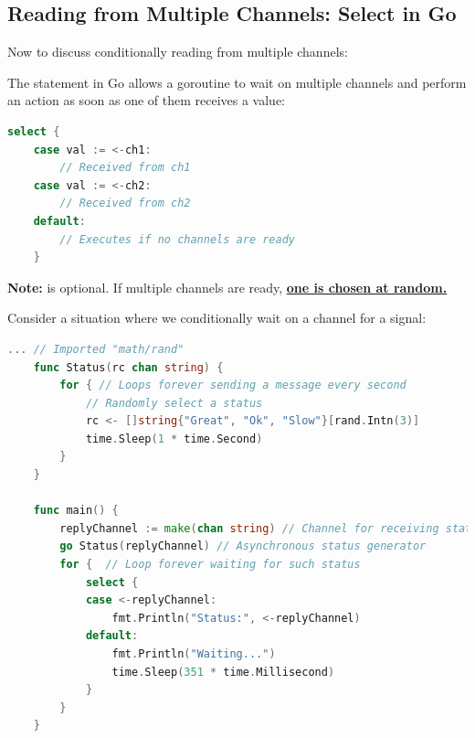 \newpage 

\subsection{Reading from Multiple Channels: Select in Go}

Now to discuss conditionally reading from multiple channels:

\begin{Def}

    The  statement in Go allows a goroutine to wait on multiple channels and perform an action as soon as one of them receives a value:
    \begin{lstlisting}[language=Go]
    select {
    case val := <-ch1:
        // Received from ch1
    case val := <-ch2:
        // Received from ch2
    default:
        // Executes if no channels are ready
    }
    \end{lstlisting}

    \noindent
    \textbf{Note:}  is optional. If multiple channels are ready, \underline{\textbf{one is chosen at random.}}
    \end{Def}
    
    \vspace{-.5em}
\begin{Example}
    
    Consider a situation where we conditionally wait on a channel for a signal:
    \begin{lstlisting}[language=Go, numbers=none]
    ... // Imported "math/rand"
    func Status(rc chan string) {
        for { // Loops forever sending a message every second
            // Randomly select a status
            rc <- []string{"Great", "Ok", "Slow"}[rand.Intn(3)]
            time.Sleep(1 * time.Second)
        }
    }
    
    func main() {
        replyChannel := make(chan string) // Channel for receiving status
        go Status(replyChannel) // Asynchronous status generator
        for {  // Loop forever waiting for such status
            select {
            case <-replyChannel:
                fmt.Println("Status:", <-replyChannel)
            default:
                fmt.Println("Waiting...")
                time.Sleep(351 * time.Millisecond)
            }
        }
    }
    \end{lstlisting}
    \end{Example}


